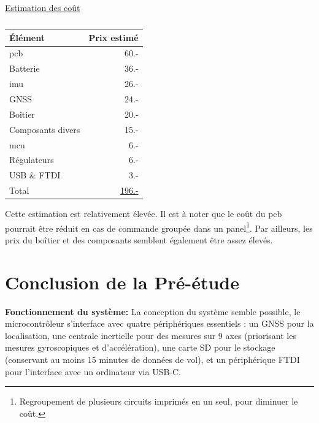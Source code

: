 \begin{center}
	\underline{Estimation des coût} 
	\vspace{-4mm}
	\begin{table}[h]
		\centering
		\begin{tabular}{lr}
			Élément & Prix estimé \\
			\hline
			\gls{pcb} & 60.- \\
			Batterie & 36.- \\
			\gls{imu} & 26.- \\
			\gls{GNSS} & 24.- \\
			Boîtier & 20.- \\
			Composants divers & 15.- \\
			\gls{mcu} & 6.- \\
			Régulateurs & 6.- \\
			USB \& \gls{FTDI} & 3.- \\
			\hline
			Total & \underline{196.-} \\
			\hline
		\end{tabular}
		\caption{}
		\label{tab:estimcouts}
	\end{table}
\end{center} \vspace{-5mm}

Cette estimation est relativement élevée. Il est à noter que le coût du \gls{pcb} pourrait être réduit en cas de commande groupée dans un panel\footnote{Regroupement de plusieurs circuits imprimés en un seul, pour diminuer le coût.}. Par ailleurs, les prix du boîtier et des composants semblent également être assez élevés.


\section{Conclusion de la Pré-étude}

\textbf{Fonctionnement du système:}
La conception du système semble possible, le microcontrôleur s'interface avec quatre périphériques essentiels : un \gls{GNSS} pour la localisation, une centrale inertielle pour des mesures sur 9 axes (priorisant les mesures gyroscopiques et d'accélération), une carte SD pour le stockage (conservant au moins 15 minutes de données de vol), et un périphérique \gls{FTDI} pour l'interface avec un ordinateur via USB-C.

